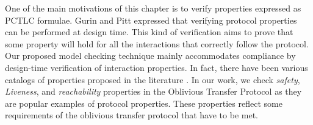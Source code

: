 One of the main motivations of this chapter is to verify properties expressed as PCTLC formulae. Gurin and Pitt \cite{Guerin2002} expressed that verifying protocol properties can be performed at design time. This kind of verification aims to prove that some property will hold for all the interactions that correctly follow the protocol. Our proposed model checking technique mainly accommodates compliance by design-time verification of interaction properties. In fact, there have been various catalogs of properties proposed in the literature \cite{Bentahar2009,Cheng2006,Desai2007}. In our work, we
check \emph{safety}, \emph{Liveness}, and \emph{reachability}
properties in the Oblivious Transfer Protocol as they are popular
examples of protocol properties. These properties reflect some requirements of the oblivious transfer protocol that have to be met.

